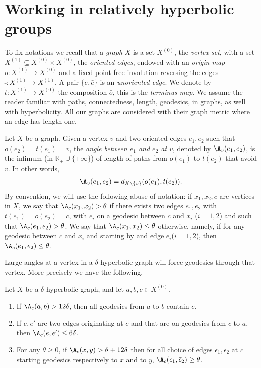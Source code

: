 \section{Working in relatively hyperbolic groups}\label{bases}

To fix notations we recall that a \emph{graph} $X$ is a set $X^{(0)}$, the \emph{vertex set}, with a set $X^{(1)}\subseteq X^{(0)}\times X^{(0)}$, the \emph{oriented edges}, endowed with an \emph{origin map} $o:X^{(1)} \to X^{(0)}$ and a fixed-point free involution reversing the edges $\bar{\ }: X^{(1)}\to X^{(1)}$. A pair $\{e,\bar e\}$ is an \emph{unoriented edge}. We denote by $t:X^{(1)} \to X^{(0)}$ the composition $\bar o$, this is the \emph{terminus map}. We assume the reader familiar with paths, connectedness, length, geodesics, in graphs, as well with hyperbolicity. All our graphs are considered with their graph metric where an edge has length one.

\begin{defi}
Let $X$ be a graph. Given a vertex $v$ and two oriented edges $e_1, e_2$ such that $o(e_2) = t(e_1) =v$, the \emph{angle between $e_1$ and $e_2$ at $v$}, denoted by $\A_v(e_1,e_2)$, is the infimum (in $\mathbb{R_+} \cup \{+\infty\}$) of length of paths from $o(e_1)$ to $t(e_2) $ that avoid $v$. In other words,
\[
\A_v(e_1,e_2)=d_{X\setminus\{v\}}(o(e_1),t(e_2)).
\]
By convention, we will use the following abuse of notation: if $x_1, x_2,c$ are vertices in $X$, we say that $\A_c(x_1,x_2)>\theta$ if there exists two edges $e_1, e_2$ with $t(e_1)= o(e_2) =c$, with $e_i$ on a geodesic between $c$ and $x_i$ ($i=1,2$) and such that $\A_c(e_1,e_2)>\theta$. We say that $\A_c(x_1,x_2)\leq\theta$ otherwise, namely, if for any geodesic between $c$ and $x_i$ and starting by and edge $e_i$($i=1,2$), then $\A_c(e_1,e_2)\leq\theta$.
\end{defi}

Large angles at a vertex in a $\delta$-hyperbolic graph will force geodesics through that vertex. More precisely we have the following.

\begin{prop}\label{prop;goulet}
Let $X$ be a $\delta$-hyperbolic graph, and let $a,b,c\in X^{(0)}$.
\begin{enumerate}
\item \label{1.2.1} If $\A_c{(a,b)} >12\delta$, then all geodesics from $a$ to $b$ contain $c$.
\item \label{1.2.2} If $e,e'$ are two edges originating at $c$ and that are on geodesics from $c$ to $a$, then $\A_c(e, \bar e') \leq 6\delta$.
\item \label{1.2.3} For any $\theta\geq 0$, if $\A_c(x,y) > \theta + 12\delta$ then for all choice of edges $\epsilon_1, \epsilon_2$ at $c$ starting geodesics respectively to $x$ and to $y$, $\A_c(\epsilon_1, \bar \epsilon_2) \geq \theta$.
\end{enumerate}
\end{prop}


